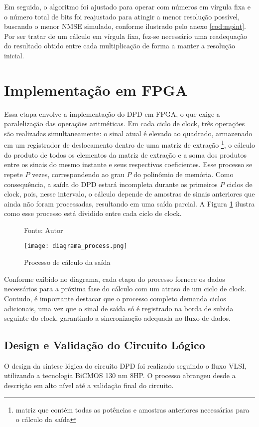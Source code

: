 Em seguida, o algoritmo foi ajustado para operar com números em vírgula fixa e o número total de bits foi reajustado para atingir a menor resolução possível, buscando o menor NMSE simulado, conforme ilustrado pelo anexo \ref{cod:mpint}. Por ser tratar de um cálculo em vírgula fixa, fez-se necessário uma readequação do resultado obtido entre cada multiplicação de forma a manter a resolução inicial.

\section{Implementação em FPGA}
Essa etapa envolve a implementação do DPD em FPGA, o que exige a paralelização das operações aritméticas. Em cada ciclo de clock, três operações são realizadas simultaneamente: o sinal atual é elevado ao quadrado, armazenado em um registrador de deslocamento dentro de uma matriz de extração \footnote{matriz que contém todas as potências e amostras anteriores necessárias para o cálculo da saída}, o cálculo do produto de todos os elementos da matriz de extração e a soma dos produtos entre os sinais do mesmo instante e seus respectivos coeficientes. Esse processo se repete \( P \) vezes, correspondendo ao grau \( P \) do polinômio de memória. Como consequência, a saída do DPD estará incompleta durante os primeiros \( P \) ciclos de clock, pois, nesse intervalo, o cálculo depende de amostras de sinais anteriores que ainda não foram processadas, resultando em uma saída parcial.
 A Figura \ref{fig:diagramaprocess} ilustra como esse processo está dividido entre cada ciclo de clock.
 
\begin{figure}[htbp!]
  \centering
  \captionsetup{justification=centering}
  \caption*{Fonte: Autor}
  \texttt{[image: diagrama\_process.png]}
  \caption{Processo de cálculo da saída}
  \label{fig:diagramaprocess}
\end{figure}
Conforme exibido no diagrama, cada etapa do processo fornece os dados necessários para a próxima fase do cálculo com um atraso de um ciclo de clock. Contudo, é importante destacar que o processo completo demanda ciclos adicionais, uma vez que o sinal de saída só é registrado na borda de subida seguinte do clock, garantindo a sincronização adequada no fluxo de dados.

\subsection{Design e Validação do Circuito Lógico}  
O design da síntese lógica do circuito DPD foi realizado seguindo o fluxo VLSI, utilizando a tecnologia BiCMOS 130 nm 8HP. O processo abrangeu desde a descrição em alto nível até a validação final do circuito.  


